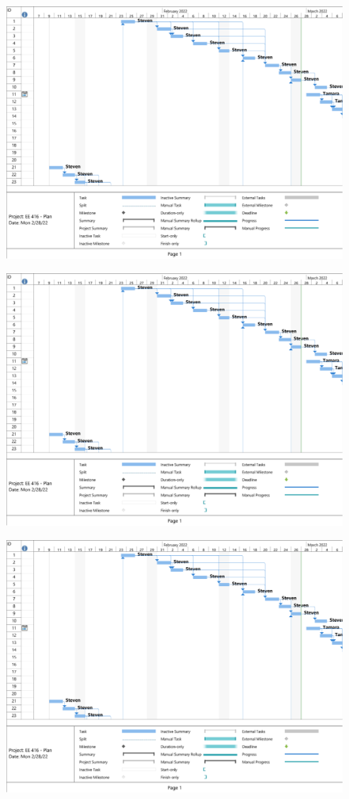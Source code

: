 \documentclass[11pt,letterpaper,conference]{IEEEtran}
\begin{document}
\begin{figure}[th]
    \centering
    \includegraphics[width=\textwidth, page=4]{ext/gantt.pdf}
\end{figure}
\begin{figure}[th]
    \centering
    \includegraphics[width=\textwidth, page=5]{ext/gantt.pdf}
\end{figure}
\begin{figure}[th]
    \centering
    \includegraphics[width=\textwidth, page=6]{ext/gantt.pdf}
\end{figure}
\end{document}
